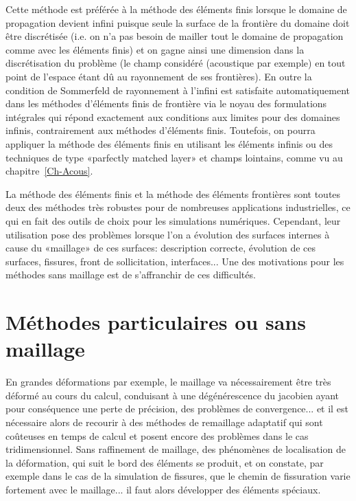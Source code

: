 \medskip
Cette méthode est préférée à la méthode des éléments finis lorsque le domaine de propagation devient infini puisque seule la surface de la frontière du domaine doit être discrétisée (i.e. on n'a pas besoin de mailler tout le domaine de propagation comme avec les éléments finis) et on gagne ainsi une dimension dans la discrétisation du problème (le champ considéré (acoustique par exemple) en tout point de l'espace étant dû au rayonnement de ses frontières). En outre la condition de Sommerfeld de rayonnement à l'infini est satisfaite automatiquement dans les méthodes d'éléments finis de frontière via le noyau des formulations intégrales qui répond exactement aux conditions aux limites pour des domaines infinis, contrairement aux méthodes d'éléments finis. Toutefois, on pourra appliquer la méthode des éléments finis en utilisant les éléments infinis ou des techniques de type «parfectly matched layer» et champs lointains, comme vu au chapitre~\ref{Ch-Acous}.

\medskip
La méthode des éléments finis et la méthode des éléments frontières sont toutes deux des méthodes très robustes pour de nombreuses applications industrielles, ce qui en fait des outils de choix pour les simulations numériques. Cependant, leur utilisation pose des problèmes lorsque l'on a évolution des surfaces internes à cause du «maillage» de ces surfaces: description correcte, évolution de ces surfaces, fissures, front de sollicitation, interfaces... Une des motivations pour les méthodes sans maillage est de s'affranchir de ces difficultés.



\medskip
\section{Méthodes particulaires ou sans maillage}\label{Sec-meshless}

En grandes déformations par exemple, le maillage va nécessairement être très déformé au cours du calcul, conduisant à une dégénérescence du jacobien ayant pour conséquence une perte de précision, des problèmes de convergence... et il est nécessaire alors de recourir à des méthodes de remaillage adaptatif qui sont coûteuses en temps de calcul et posent encore des problèmes dans le cas tridimensionnel.
Sans raffinement de maillage, des phénomènes de localisation de la déformation, qui suit le bord des éléments se produit, et on constate, par exemple dans le cas de la simulation de fissures, que le chemin de fissuration varie fortement avec le maillage... il faut alors développer des éléments spéciaux.

